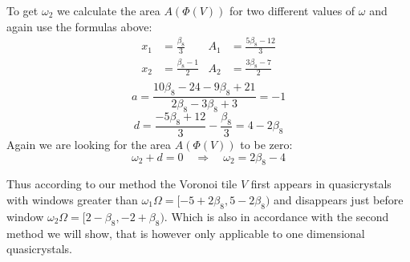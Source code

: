 \documentclass[text.tex]{subfiles}
\begin{document}
To get $\omega_2$ we calculate the area $A(\Phi(V))$ for two different values of $\omega$ and again use the formulas above: 
\begin{align*}
x_1&=\frac{\beta_8}{3} & A_1&=\frac{5\beta_8-12}{3} \\
x_2&=\frac{\beta_8-1}{2} & A_2&=\frac{3\beta_8-7}{2} \\
\end{align*}
$$a = \frac{10\beta_8-24-9\beta_8+21}{2\beta_8-3\beta_8+3} = -1$$
$$d = \frac{-5\beta_8+12}{3}-\frac{\beta_8}{3} = 4-2\beta_8$$
Again we are looking for the area $A(\Phi(V))$ to be zero:
$$\omega_2+d=0\quad\Rightarrow\quad \omega_2 = 2\beta_8-4$$

Thus according to our method the Voronoi tile $V$ first appears in quasicrystals with windows greater than $\omega_1\Omega = [-5+2\beta_8, 5-2\beta_8)$ and disappears just before window $\omega_2\Omega = [2-\beta_8, -2+\beta_8)$. Which is also in accordance with the second method we will show, that is however only applicable to one dimensional quasicrystals. 
\end{document}
